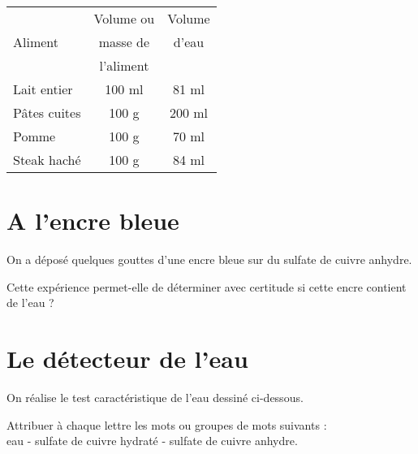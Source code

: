 \documentclass[a4paper,11pt]{exam}
\begin{document}
\begin{center}
	\begin{tabular}{|l|c|c|}
		\hline
		& Volume ou & Volume \\ 
		Aliment      & masse de  & d'eau  \\ 
		& l'aliment &        \\ \hline
		Lait entier  & 100 ml    & 81 ml  \\ \hline
		Pâtes cuites & 100 g     & 200 ml \\ \hline
		Pomme        & 100 g     & 70 ml  \\ \hline
		Steak haché  & 100 g     & 84 ml  \\ \hline
	\end{tabular}
\end{center}

\newpage

\section{A l'encre bleue}

On a déposé quelques gouttes d'une encre bleue sur du sulfate de cuivre anhydre.

\begin{questions}
	\question Cette expérience permet-elle de déterminer avec certitude si cette encre contient de l'eau ?
\end{questions}


\section{Le détecteur de l'eau}

On réalise le test caractéristique de l'eau dessiné ci-dessous.

\begin{questions}
	\question Attribuer à chaque lettre les mots ou groupes de mots suivants : \\
	eau - sulfate de cuivre hydraté - sulfate de cuivre anhydre.
\end{questions}


\ \label{LastPage}
\end{document}
